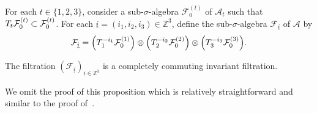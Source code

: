\documentclass[10pt]{amsart}
\theoremstyle{definition}\newtheorem{defi}[theo]{Definition}\newtheorem{rema}[theo]{Remark}\newtheorem{exam}[theo]{Example}\newtheorem{exem}[theo]{Example}\newtheorem{nota}[theo]{Notation}
\newcommand{\Z}{\mathbb{Z}}
\newcommand{\Aca}{\mathcal{A}}
\newcommand{\Fca}{\mathcal{F}}
\newcommand{\pr}[1]{\left(#1\right)}
\let\originalleft\left
\let\originalright\right
\renewcommand{\left}{\mathopen{}\mathclose\bgroup\originalleft}
\renewcommand{\right}{\aftergroup\egroup\originalright}
\begin{document}
{For each $t\in\{1,2,3\}$, consider a sub-$\sigma$-algebra $\Fca_0^{(t)}$ of $\Aca_t$ such that $T_t\Fca_0^{\pr{t}}\subset \Fca_0^{\pr{t}}$. For each $\underline{i}=(i_1,i_2,i_3)\in\Z^3$, define the sub-$\sigma$-algebra $\Fca_{\underline{i}}$ of $\Aca$ by
\begin{equation}\label{filtration-produit}
\Fca_{\underline{i}}=\pr{T_1^{-i_1}\Fca_0^{\pr{1}}}\otimes
\pr{T_2^{-i_2}\Fca_0^{\pr{2}}}\otimes \pr{T_3^{-i_3}\Fca_0^{\pr{3}}}.
\end{equation}
}

\begin{prop}
The filtration {$(\Fca_{\underline{i}})_{\underline{i}\in\Z^3}$} is a completely commuting invariant filtration.
\end{prop}

We omit the proof of this proposition which is relatively straightforward and similar to the proof of~\cite[Proposition~1.2]{MR4754186}.
\end{document}
